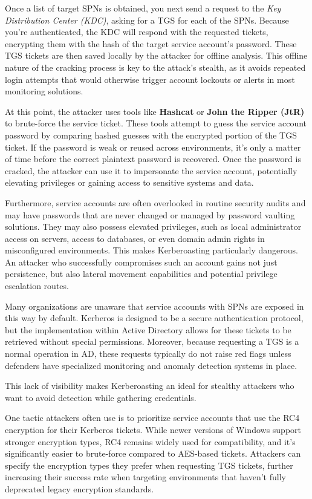 Once a list of target SPNs is obtained, you next send a request to the \textit{Key Distribution Center (KDC)}, asking for a TGS for each of the SPNs. Because you’re authenticated, the KDC will respond with the requested tickets, encrypting them with the hash of the target service account’s password. These TGS tickets are then saved locally by the attacker for offline analysis. This offline nature of the cracking process is key to the attack’s stealth, as it avoids repeated login attempts that would otherwise trigger account lockouts or alerts in most monitoring solutions.

At this point, the attacker uses tools like \textbf{Hashcat} or \textbf{John the Ripper (JtR)} to brute-force the service ticket. These tools attempt to guess the service account password by comparing hashed guesses with the encrypted portion of the TGS ticket. If the password is weak or reused across environments, it’s only a matter of time before the correct plaintext password is recovered. Once the password is cracked, the attacker can use it to impersonate the service account, potentially elevating privileges or gaining access to sensitive systems and data.

Furthermore, service accounts are often overlooked in routine security audits and may have passwords that are never changed or managed by password vaulting solutions. They may also possess elevated privileges, such as local administrator access on servers, access to databases, or even domain admin rights in misconfigured environments. This makes Kerberoasting particularly dangerous. An attacker who successfully compromises such an account gains not just persistence, but also lateral movement capabilities and potential privilege escalation routes.

Many organizations are unaware that service accounts with SPNs are exposed in this way by default. Kerberos is designed to be a secure authentication protocol, but the implementation within Active Directory allows for these tickets to be retrieved without special permissions. Moreover, because requesting a TGS is a normal operation in AD, these requests typically do not raise red flags unless defenders have specialized monitoring and anomaly detection systems in place.

This lack of visibility makes Kerberoasting an ideal for stealthy attackers who want to avoid detection while gathering credentials.

One tactic attackers often use is to prioritize service accounts that use the RC4 encryption for their Kerberos tickets. While newer versions of Windows support stronger encryption types, RC4 remains widely used for compatibility, and it’s significantly easier to brute-force compared to AES-based tickets. Attackers can specify the encryption types they prefer when requesting TGS tickets, further increasing their success rate when targeting environments that haven’t fully deprecated legacy encryption standards.

